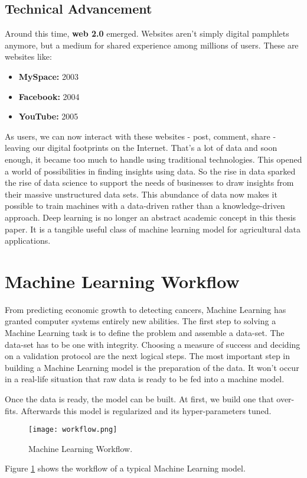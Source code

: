 \subsection{Technical Advancement}
Around this time, \textbf{web 2.0} emerged. Websites aren't simply digital pamphlets anymore, but a medium for shared experience among millions of users. These are websites like:
\begin{itemize}
	\item \textbf{MySpace:} 2003
	\item \textbf{Facebook:} 2004
	\item \textbf{YouTube:} 2005	
\end{itemize}

As users, we can now interact with these websites - post, comment, share - leaving our digital footprints on the Internet. That's a lot of data and soon enough, it became too much to handle using traditional technologies. This opened a world of possibilities in finding insights using data. So the rise in data sparked the rise of data science to support the needs of businesses to draw insights from their massive unstructured data sets. This abundance of data now makes it possible to train machines with a data-driven rather than a knowledge-driven approach. Deep learning is no longer an abstract academic concept in this thesis paper. It is a tangible useful class of machine learning model for agricultural data applications.

\section{Machine Learning Workflow}
From predicting economic growth to detecting cancers, Machine Learning has granted computer systems entirely new abilities. The first step to solving a Machine Learning task is to define the problem and assemble a data-set. The data-set has to be one with integrity. Choosing a measure of success and deciding on a validation protocol are the next logical steps. The most important step in building a Machine Learning model is the preparation of the data. It won't occur in a real-life situation that raw data is ready to be fed into a machine model. 

Once the data is ready, the model can be built. At first, we build one that over-fits. Afterwards this model is regularized and its hyper-parameters tuned. 

\begin{figure}[h!]
	\texttt{[image: workflow.png]}
	\caption{Machine Learning Workflow.}
	\label{fig:workflow}
\end{figure}

Figure \ref{fig:workflow} shows the workflow of a typical Machine Learning model.
